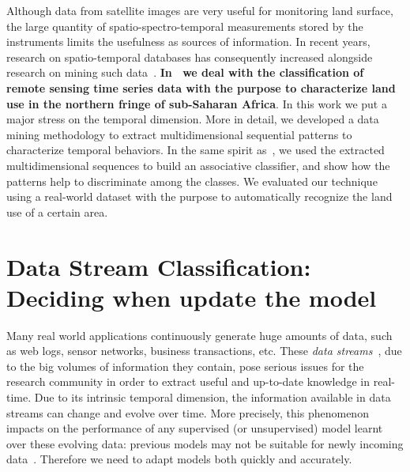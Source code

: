 Although data from satellite images are very useful for monitoring land surface, the large quantity of spatio-spectro-temporal measurements stored by the instruments limits the usefulness as sources of information. In recent years, research on spatio-temporal databases has consequently increased alongside research on mining such data~\cite{BogornyS10}. 
\textbf{In~\cite{PitarchIVBLPST15} we deal with the classification of remote sensing time series data with the purpose to characterize land use in the northern fringe of sub-Saharan Africa}. 
In this work we put a major stress on the temporal dimension.
More in detail, we developed a data mining methodology to extract multidimensional sequential patterns to characterize temporal behaviors. In the same spirit as~\cite{MeoBI12}, we used the extracted multidimensional sequences to build an associative classifier, and show how the patterns help to discriminate among the classes. We evaluated our technique using a real-world dataset with the purpose to automatically recognize the land use of a certain area.

\section{Data Stream Classification: Deciding when update the model} 

Many real world applications continuously generate huge amounts of data, such as web logs, sensor networks, business transactions, etc. 
These {\em data streams}~\cite{aggarwal2007book}, due to the big volumes of information they contain, pose serious issues for the research community in order to extract useful and up-to-date knowledge in real-time. Due to its intrinsic temporal dimension, the information available in data streams can change and evolve over time. 
More precisely, this phenomenon impacts on the performance of any supervised (or unsupervised) model learnt over these evolving data: previous models may not be suitable for newly incoming data~\cite{aggarwal2007book}. Therefore we need to adapt models both quickly and accurately.


